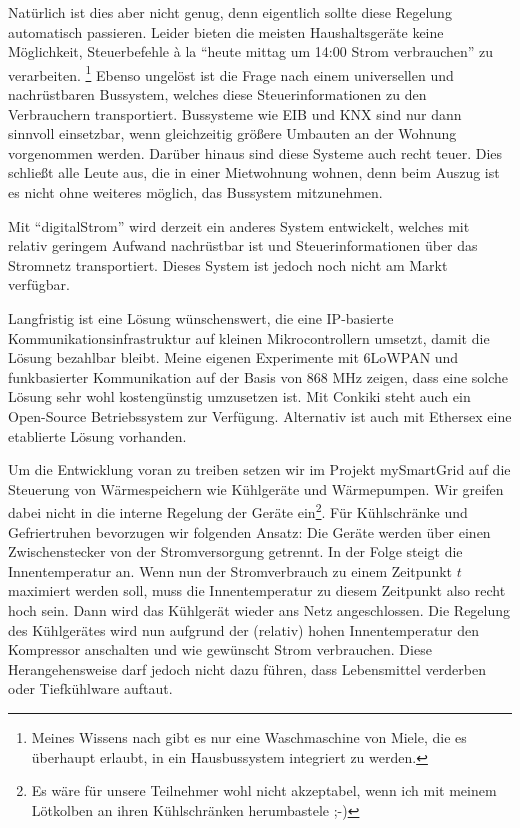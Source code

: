 \documentclass[12pt,BCOR=8.5mm]{scrartcl}
\begin{document}
Natürlich ist dies aber nicht genug, denn eigentlich sollte diese
Regelung automatisch passieren. Leider bieten die meisten
Haushaltsgeräte keine Möglichkeit, Steuerbefehle à la "`heute mittag um
14:00 Strom verbrauchen"' zu verarbeiten. \footnote{Meines Wissens nach
gibt es nur eine Waschmaschine von Miele, die es überhaupt erlaubt, in
ein Hausbussystem integriert zu werden.} Ebenso ungelöst ist die Frage
nach einem universellen und nachrüstbaren Bussystem, welches diese
Steuerinformationen zu den Verbrauchern transportiert. Bussysteme wie
EIB und KNX sind nur dann sinnvoll einsetzbar, wenn gleichzeitig größere
Umbauten an der Wohnung vorgenommen werden. Darüber hinaus sind diese
Systeme auch recht teuer. Dies schließt alle Leute aus, die in einer
Mietwohnung wohnen, denn beim Auszug ist es nicht ohne weiteres
möglich, das Bussystem mitzunehmen.

Mit "`digitalStrom"' wird derzeit ein anderes System entwickelt, welches
mit relativ geringem Aufwand nachrüstbar ist und Steuerinformationen
über das Stromnetz transportiert. Dieses System ist jedoch noch nicht am
Markt verfügbar.

Langfristig ist eine Lösung wünschenswert, die eine IP-basierte
Kommunikationsinfrastruktur auf kleinen Mikrocontrollern umsetzt, damit
die Lösung bezahlbar bleibt. Meine eigenen Experimente mit 6LoWPAN und
funkbasierter Kommunikation auf der Basis von 868 MHz zeigen, dass eine
solche Lösung sehr wohl kostengünstig umzusetzen ist. Mit Conkiki  steht auch ein Open-Source
Betriebssystem zur Verfügung. Alternativ ist auch mit Ethersex
 eine etablierte Lösung vorhanden. 

Um die Entwicklung voran zu treiben setzen wir im Projekt mySmartGrid
auf die Steuerung von Wärmespeichern wie Kühlgeräte und Wärmepumpen. Wir
greifen dabei nicht in die interne Regelung der Geräte
ein\footnote{Es wäre für unsere Teilnehmer wohl nicht akzeptabel, wenn
ich mit meinem Lötkolben an ihren Kühlschränken herumbastele ;-)}. Für
Kühlschränke und Gefriertruhen bevorzugen wir folgenden Ansatz: Die
Geräte werden über einen Zwischenstecker von der Stromversorgung
getrennt. In der Folge steigt die Innentemperatur an. Wenn nun der
Stromverbrauch zu einem Zeitpunkt $t$ maximiert werden soll, muss die
Innentemperatur zu diesem Zeitpunkt also recht hoch sein. Dann wird das
Kühlgerät wieder ans Netz angeschlossen. Die Regelung des Kühlgerätes
wird nun aufgrund der (relativ) hohen Innentemperatur den Kompressor
anschalten und wie gewünscht Strom verbrauchen. Diese Herangehensweise
darf jedoch nicht dazu führen, dass Lebensmittel verderben oder
Tiefkühlware auftaut.
\end{document}

